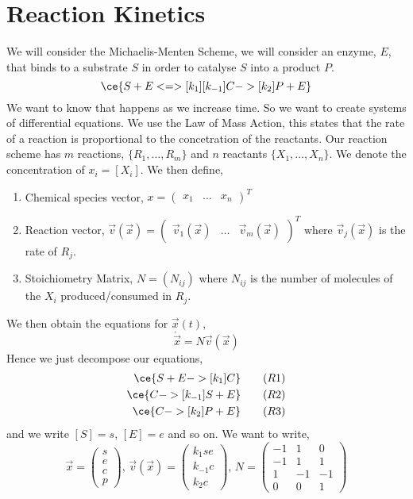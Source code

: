 \section{Reaction Kinetics}
We will consider the Michaelis-Menten Scheme, we will consider an enzyme, $E$, that binds to a substrate $S$ in order to catalyse $S$ into a product $P$.
$$ \ce{S + E <=>[k_1][k_{-1}] C ->[k_2] P + E} $$
We want to know that happens as we increase time. So we want to create systems of differential equations. We use the Law of Mass Action, this states that the rate of a reaction is proportional to the concetration of the reactants. Our reaction scheme has $m$ reactions, $\{R_1, \dots, R_m\}$ and $n$ reactants $\{X_1, \dots, X_n\}$. We denote the concentration of $x_i = [X_i]$. We then define,
\begin{enumerate}
  \item Chemical species vector, $x = \begin{pmatrix}
    x_1 & \dots & x_n
  \end{pmatrix}^T$
  \item Reaction vector, $\vec v(\vec x) = \begin{pmatrix}
    \vec v_1(\vec x) & \dots & \vec v_m(\vec x)
  \end{pmatrix}^T$ where $\vec v_j (\vec x)$ is the rate of $R_j$.
  \item Stoichiometry Matrix, $N = (N_{ij})$ where $N_{ij}$ is the number of molecules of the $X_i$ produced/consumed in $R_j$.
\end{enumerate}
We then obtain the equations for $\vec x(t)$,
$$ \dot{\vec x} = N\vec v(\vec x) $$
Hence we just decompose our equations,
\begin{align}
  \ce{S + E ->[k_1] C} \tag{$R1$} \\
  \ce{C ->[k_{-1}] S + E} \tag{$R2$} \\
  \ce{C ->[k_2] P + E} \tag{$R3$}
\end{align}
and we write $[S] = s$, $[E] = e$ and so on. We want to write,
$$ \vec x = \begin{pmatrix}
  s \\ e \\ c \\ p
\end{pmatrix},\, \vec v(\vec x) = \begin{pmatrix}
  k_1se \\ k_{-1}c \\ k_2c
\end{pmatrix},\, N = \begin{pmatrix}
  -1 & 1 & 0\\
  -1 & 1 & 1 \\
  1 & -1 & -1\\
  0 & 0 & 1
\end{pmatrix} $$
